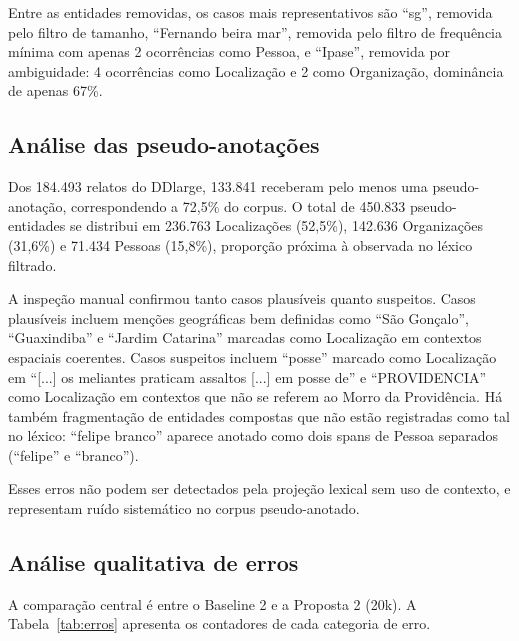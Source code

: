 \documentclass[12pt,a4paper]{article}
\begin{document}
Entre as entidades removidas, os casos mais representativos são ``sg'',
removida pelo filtro de tamanho, ``Fernando beira mar'', removida pelo filtro
de frequência mínima com apenas 2 ocorrências como Pessoa, e ``Ipase'',
removida por ambiguidade: 4 ocorrências como Localização e 2 como
Organização, dominância de apenas 67\%.

\subsection{Análise das pseudo-anotações}

Dos 184.493 relatos do DDlarge, 133.841 receberam pelo menos uma pseudo-anotação,
correspondendo a 72,5\% do corpus. O total de 450.833 pseudo-entidades se
distribui em 236.763 Localizações (52,5\%), 142.636 Organizações (31,6\%) e
71.434 Pessoas (15,8\%), proporção próxima à observada no léxico filtrado.

A inspeção manual confirmou tanto casos plausíveis quanto suspeitos. Casos
plausíveis incluem menções geográficas bem definidas como ``São Gonçalo'',
``Guaxindiba'' e ``Jardim Catarina'' marcadas como Localização em contextos
espaciais coerentes. Casos suspeitos incluem ``posse'' marcado como
Localização em ``[...] os meliantes praticam assaltos [...] em posse de'' e
``PROVIDENCIA'' como Localização em contextos que não se referem ao Morro da
Providência. Há também fragmentação de entidades compostas que não estão
registradas como tal no léxico: ``felipe branco'' aparece anotado como dois
spans de Pessoa separados (``felipe'' e ``branco'').

Esses erros não podem ser detectados pela projeção lexical sem uso de contexto,
e representam ruído sistemático no corpus pseudo-anotado.

\subsection{Análise qualitativa de erros}

A comparação central é entre o Baseline 2 e a Proposta 2 (20k). A
Tabela~\ref{tab:erros} apresenta os contadores de cada categoria de erro.
\end{document}
